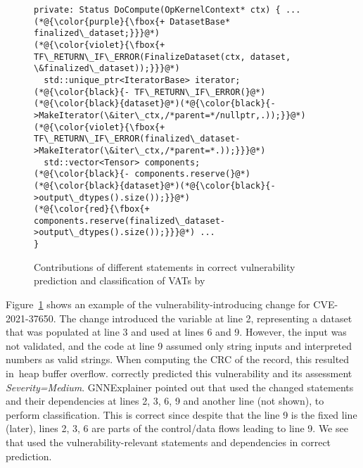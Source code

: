 \begin{figure}[t]
\centering
{}
	\begin{lstlisting}[]
private: Status DoCompute(OpKernelContext* ctx) { ...
(*@{\color{purple}{\fbox{+ DatasetBase* finalized\_dataset;}}}@*)
(*@{\color{violet}{\fbox{+ TF\_RETURN\_IF\_ERROR(FinalizeDataset(ctx, dataset, \&finalized\_dataset));}}}@*)
  std::unique_ptr<IteratorBase> iterator;
(*@{\color{black}{- TF\_RETURN\_IF\_ERROR(}@*)(*@{\color{black}{dataset}@*)(*@{\color{black}{->MakeIterator(\&iter\_ctx,/*parent=*/nullptr,.));}}@*)
(*@{\color{violet}{\fbox{+ TF\_RETURN\_IF\_ERROR(finalized\_dataset->MakeIterator(\&iter\_ctx,/*parent=*.));}}}@*)
  std::vector<Tensor> components;
(*@{\color{black}{- components.reserve(}@*)(*@{\color{black}{dataset}@*)(*@{\color{black}{->output\_dtypes().size());}}@*)
(*@{\color{red}{\fbox{+ components.reserve(finalized\_dataset->output\_dtypes().size());}}}@*) ...
}
\end{lstlisting}
\vspace{-15pt}
\caption{Contributions of different statements in correct
vulnerability prediction and classification of VATs by {\tool}}
\vspace{-6pt}
\label{gnn-example}
\end{figure}





 Figure~\ref{gnn-example} shows an example of
the vulnerability-introduc\-ing change for CVE-2021-37650. The change
introduced the variable  at line 2,
representing a dataset that was populated at line 3 and used at lines
6 and 9. However, the input was not validated, and the code at line 9
assumed only string inputs and interpreted numbers as valid strings.
When computing the CRC of the record, this resulted in~heap buffer
overflow. {\tool} correctly predicted this vulnerability and its
assessment {\em Severity=Medium}. GNNExplainer pointed out that
{\tool} used the changed statements and their dependencies at lines 2, 3, 6, 9
and another line (not shown), to perform classification. This is
correct since despite that the line 9 is the fixed line (later), lines 2, 3, 6
are parts of the control/data flows leading to line 9. We see that
{\tool} used the vulnerability-relevant statements and
dependencies in correct prediction.

